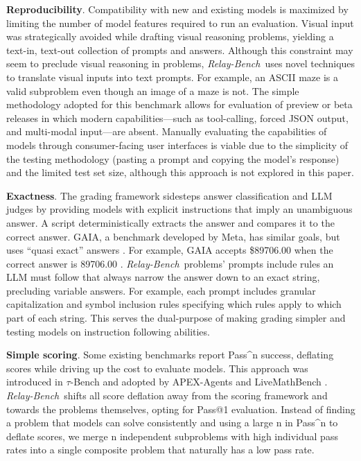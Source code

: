 \documentclass[10pt,letterpaper,twocolumn]{article}
\newcommand{\relaybench}{\texorpdfstring{{\textit{Relay-Bench}}}{Relay-Bench}}
\begin{document}
\textbf{Reproducibility}. Compatibility with new and existing models is maximized by limiting the number of model features required to run an evaluation. Visual input was strategically avoided while drafting visual reasoning problems, yielding a text-in, text-out collection of prompts and answers. Although this constraint may seem to preclude visual reasoning in problems, \relaybench\ uses novel techniques to translate visual inputs into text prompts. For example, an ASCII maze is a valid subproblem even though an image of a maze is not. The simple methodology adopted for this benchmark allows for evaluation of preview or beta releases in which modern capabilities---such as tool-calling, forced JSON output, and multi-modal input---are absent. Manually evaluating the capabilities of models through consumer-facing user interfaces is viable due to the simplicity of the testing methodology (pasting a prompt and copying the model's response) and the limited test set size, although this approach is not explored in this paper.

\textbf{Exactness}. The grading framework sidesteps answer classification and LLM judges by providing models with explicit instructions that imply an unambiguous answer. A script deterministically extracts the answer and compares it to the correct answer. GAIA, a benchmark developed by Meta, has similar goals, but uses ``quasi exact'' answers \cite{gaia-paper}. For example, GAIA accepts \$89706.00 when the correct answer is 89706.00 \cite{gaia-paper}. \relaybench\ problems' prompts include rules an LLM must follow that always narrow the answer down to an exact string, precluding variable answers. For example, each prompt includes granular capitalization and symbol inclusion rules specifying which rules apply to which part of each string. This serves the dual-purpose of making grading simpler and testing models on instruction following abilities.

\textbf{Simple scoring}. Some existing benchmarks report Pass\textasciicircum{}n success, deflating scores while driving up the cost to evaluate models. This approach was introduced in $\tau$-Bench and adopted by APEX-Agents and LiveMathBench \cite{tau-bench,apex-agents,livemathbench}. \relaybench\ shifts all score deflation away from the scoring framework and towards the problems themselves, opting for Pass@1 evaluation. Instead of finding a problem that models can solve consistently and using a large n in Pass\textasciicircum{}n to deflate scores, we merge n independent subproblems with high individual pass rates into a single composite problem that naturally has a low pass rate.
\end{document}
